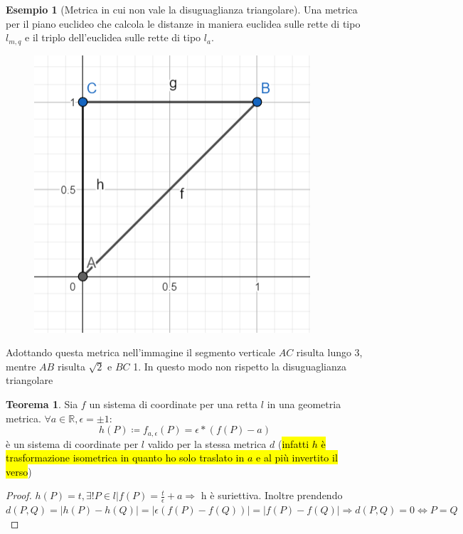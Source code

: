 \documentclass[a4paper,10pt]{article}
\theoremstyle{definition}
\newcommand{\re}{\mathbb{R}} %
\theoremstyle{indentdefinition}
\theoremstyle{indentpostulate}
\theoremstyle{indenttheorem}
\newtheorem{thm}{Teorema}[section]
\theoremstyle{myremark}
\newtheorem{example*}{Esempio}
\theoremstyle{indentgeneral}
\begin{document}
\begin{example*}[Metrica in cui non vale la disuguaglianza triangolare] Una metrica per il piano euclideo che calcola le distanze in maniera euclidea sulle rette di tipo $l_{m,q}$ e il triplo dell'euclidea sulle rette di tipo $l_a$.

\begin{figure}[H]
    \centering
    \includegraphics[scale=0.4]{NonEuclidea.png}
\end{figure}

Adottando questa metrica nell'immagine il segmento verticale $AC$ risulta lungo 3, mentre $AB$ risulta $\sqrt{2}$ e $BC$ 1. In questo modo non rispetto la disuguaglianza triangolare
\end{example*}

\begin{thm}   Sia $f$ un sistema di coordinate per una retta $l$ in una geometria metrica. $\forall a \in \re, \epsilon = \pm 1$: $$h(P)\coloneqq f_{a,\epsilon }(P)= \epsilon *(f(P)-a)$$ è un sistema di coordinate per $l$ valido per la stessa metrica $d$ (\hl{infatti $h$ è trasformazione isometrica in quanto ho solo traslato in $a$ e al più invertito il verso})   \end{thm} 

\begin{proof}  $h(P)=t, \exists ! P \in l |f(P) = \frac{t}{\epsilon} +a \Rightarrow$ h è suriettiva. Inoltre prendendo $d(P,Q)=|h(P)-h(Q)|=|\epsilon (f(P)-f(Q))|=|f(P)-f(Q)|\Rightarrow d(P,Q)=0 \iff P=Q$     \end{proof}
\end{document}
